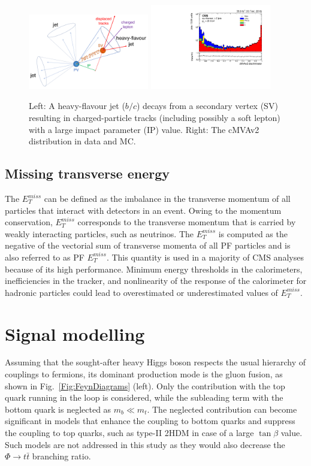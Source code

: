 \begin{figure}
 \centering
 \includegraphics[width=0.47\textwidth]{fig/chapt4/b_jets/secondary_vertex.pdf}\qquad
 \includegraphics[width=0.47\textwidth]{fig/chapt4/b_jets/cMVAv2.pdf}
 \caption{Left: A heavy-flavour jet ($b/c$) decays from a secondary vertex (SV) resulting in charged-particle tracks (including possibly a soft lepton) with a large impact parameter (IP) value.  Right: The cMVAv2 distribution in data and MC.}
 \label{Fig:heavy_flavour}
\end{figure}
\subsection{Missing transverse energy}
The $E_{T}^{miss}$ can be defined as the imbalance in the transverse momentum of all particles that interact with detectors in an event. Owing to the momentum conservation, $E_{T}^{miss}$ corresponds to the transverse momentum that is carried by weakly interacting particles, such as neutrinos. The $E_{T}^{miss}$ is computed as the negative of the vectorial sum of transverse momenta of all PF particles and is also referred to as PF $E_{T}^{miss}$. This quantity is used in a majority of CMS analyses because of its high performance. 
Minimum energy thresholds in the calorimeters, inefficiencies in the tracker, and nonlinearity of the response of the calorimeter for hadronic particles could lead to overestimated or underestimated values of $E_{T}^{miss}$.

\section{Signal modelling}\label{Sec:SgnModelling}
Assuming that the sought-after heavy Higgs boson respects the usual hierarchy of couplings to fermions, its dominant production mode is the gluon fusion, as shown in Fig.~\ref{Fig:FeynDiagrams} (left).
Only the contribution with the top quark running in the loop is considered, while the subleading term with the bottom quark is neglected as $m_{b} \ll m_{t}$.
The neglected contribution can become significant in models that enhance the coupling to bottom quarks and suppress the coupling to top quarks, such as type-II 2HDM in case of a large $\tan\beta$ value.
Such models are not addressed in this study as they would also decrease the $\Phi \rightarrow t\bar t$ branching ratio.

